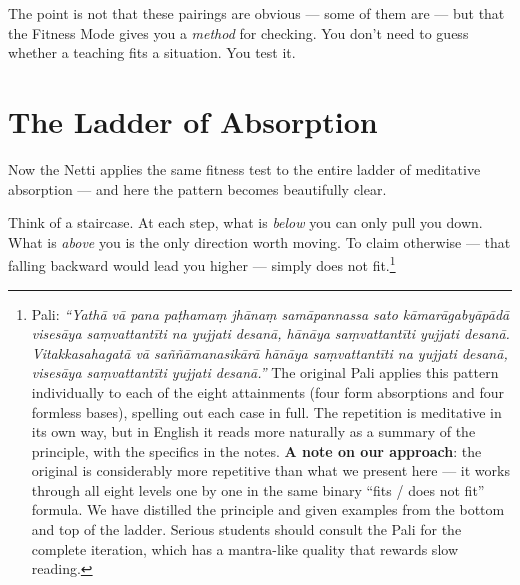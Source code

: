 The point is not that these pairings are obvious --- some of them are --- but that the Fitness Mode gives you a \textit{method} for checking. You don't need to guess whether a teaching fits a situation. You test it.

\section*{The Ladder of Absorption}

Now the Netti applies the same fitness test to the entire ladder of meditative absorption --- and here the pattern becomes beautifully clear.

Think of a staircase. At each step, what is \textit{below} you can only pull you down. What is \textit{above} you is the only direction worth moving. To claim otherwise --- that falling backward would lead you higher --- simply does not fit.\footnote{Pali: \textit{``Yathā vā pana paṭhamaṃ jhānaṃ samāpannassa sato kāmarāgabyāpādā visesāya saṃvattantīti na yujjati desanā, hānāya saṃvattantīti yujjati desanā. Vitakkasahagatā vā saññāmanasikārā hānāya saṃvattantīti na yujjati desanā, visesāya saṃvattantīti yujjati desanā.''} The original Pali applies this pattern individually to each of the eight attainments (four form absorptions and four formless bases), spelling out each case in full. The repetition is meditative in its own way, but in English it reads more naturally as a summary of the principle, with the specifics in the notes. \textbf{A note on our approach}: the original is considerably more repetitive than what we present here --- it works through all eight levels one by one in the same binary ``fits / does not fit'' formula. We have distilled the principle and given examples from the bottom and top of the ladder. Serious students should consult the Pali for the complete iteration, which has a mantra-like quality that rewards slow reading.}

